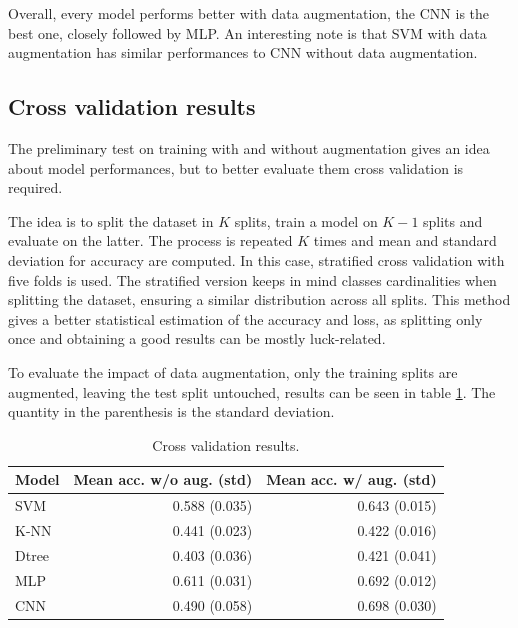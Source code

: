 \noindent Overall, every model performs better with data augmentation, the CNN is the best 
one, closely followed by MLP. An interesting note is that SVM with data augmentation 
has similar performances to CNN without data augmentation.

\subsection{Cross validation results}

The preliminary test on training with and without augmentation 
gives an idea about model performances, but to better evaluate them cross validation 
is required. 

The idea is to split the dataset in $K$ splits, train a model on $K-1$ splits
and evaluate on the latter. The process is repeated $K$ times and mean and standard deviation for
accuracy are computed. 
In this case, stratified cross validation with five folds is used. The stratified
version keeps in mind classes cardinalities when splitting the dataset, 
ensuring a similar distribution across all splits.
This method gives a better statistical estimation of the accuracy and loss, as 
splitting only once and obtaining a good results can be mostly luck-related.


To evaluate the impact of data augmentation, only the training splits are augmented, 
leaving the test split untouched, results can be seen in table \ref{tab:res3}.
The quantity in the parenthesis is the standard deviation.

\begin{table}[H]
    \begin{center}
        \begin{tabular}{ |l|r|r| } 
        \hline
        Model & Mean acc. w/o aug. (std) & Mean acc. w/ aug. (std)\\
        \hline
        SVM   &  0.588 (0.035)  &  0.643 (0.015) \\
        K-NN  &  0.441 (0.023)  &  0.422 (0.016) \\
        Dtree &  0.403 (0.036)  &  0.421 (0.041) \\
        MLP   &  0.611 (0.031)  &  0.692 (0.012) \\
        CNN   &  0.490 (0.058)  &  0.698 (0.030) \\
        \hline
        \end{tabular}
    \end{center}
    \caption{Cross validation results.} \label{tab:res3}
\end{table}


